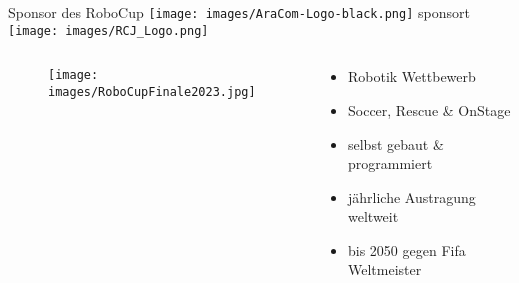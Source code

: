 \documentclass[aspectratio=169]{beamer}
\begin{document}
\begin{frame}{Sponsor des RoboCup}
  \texttt{[image: images/AraCom-Logo-black.png]} sponsort 
  \texttt{[image: images/RCJ\_Logo.png]}
  \begin{columns}
    \begin{column}{0.45\textwidth}
      \begin{figure}[h]
        \centering
      \texttt{[image: images/RoboCupFinale2023.jpg]}
      \end{figure}
    \end{column}
    \begin{column}{0.45\textwidth}
      \begin{itemize}
        \item Robotik Wettbewerb 
        \item Soccer, Rescue \& OnStage
        \item selbst gebaut \& programmiert 
        \item jährliche Austragung weltweit 
        \item bis 2050 gegen Fifa Weltmeister 
      \end{itemize}
    \end{column}
  \end{columns}
\end{frame}
\end{document}
